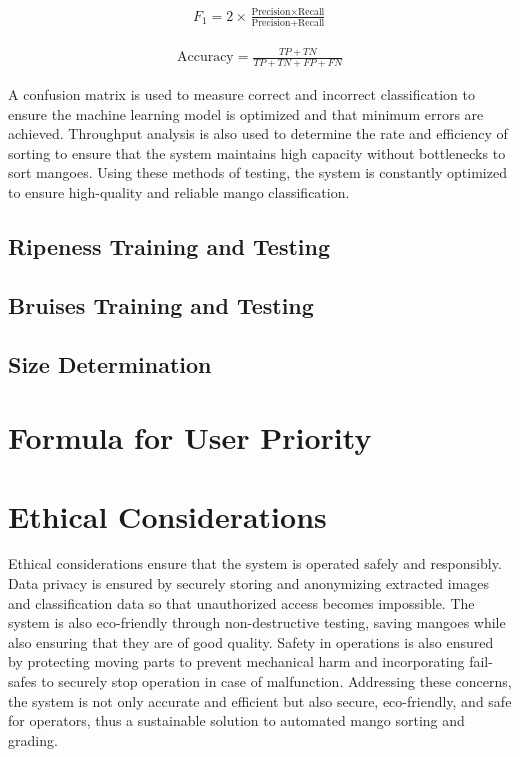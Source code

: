 \begin{eqnarray}
	F_1 = 2\times \frac{\text{Precision} \times \text{Recall}}{\text{Precision} + \text{Recall}}
	\label{eq:f1_score}
\end{eqnarray}

\begin{eqnarray}
	\text{Accuracy} = \frac{TP + TN}{TP + TN + FP + FN}
	\label{eq:accuracy}
\end{eqnarray}

A confusion matrix is used to measure correct and incorrect classification to ensure the machine learning model is optimized and that minimum errors are achieved. Throughput analysis is also used to determine the rate and efficiency of sorting to ensure that the system maintains high capacity without bottlenecks to sort mangoes. Using these methods of testing, the system is constantly optimized to ensure high-quality and reliable mango classification.

\subsection{Ripeness Training and Testing} \label{sec:ripenesstraining}

\subsection{Bruises Training and Testing} \label{sec:bruisestraining}

\subsection{Size Determination} \label{sec:sizeDetermination}

\section{Formula for User Priority} \label{sec:formula}

\section{Ethical Considerations}
Ethical considerations ensure that the system is operated safely and responsibly. Data privacy is ensured by securely storing and anonymizing extracted images and classification data so that unauthorized access becomes impossible. The system is also eco-friendly through non-destructive testing, saving mangoes while also ensuring that they are of good quality. Safety in operations is also ensured by protecting moving parts to prevent mechanical harm and incorporating fail-safes to securely stop operation in case of malfunction. Addressing these concerns, the system is not only accurate and efficient but also secure, eco-friendly, and safe for operators, thus a sustainable solution to automated mango sorting and grading.





